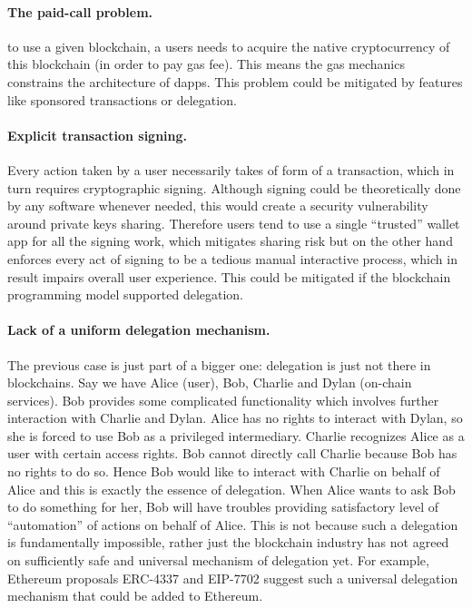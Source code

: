 \documentclass[a4paper]{article}
\begin{document}
\paragraph{The paid-call problem.} to use a given blockchain, a users needs to acquire the native cryptocurrency of this blockchain (in order to pay gas fee). This means the gas mechanics constrains the architecture of dapps. This problem could be mitigated by features like sponsored transactions or delegation.
\paragraph{Explicit transaction signing.} Every action taken by a user necessarily takes of form of a transaction, which in turn requires cryptographic signing. Although signing could be theoretically done by any software whenever needed, this would create a security vulnerability around private keys sharing. Therefore users tend to use a single ``trusted'' wallet app for all the signing work, which mitigates sharing risk but on the other hand enforces every act of signing to be a tedious manual interactive process, which in result impairs overall user experience. This could be mitigated if the blockchain programming model supported delegation.
\paragraph{Lack of a uniform delegation mechanism.} The previous case is just part of a bigger one: delegation is just not there in blockchains. Say we have Alice (user), Bob, Charlie and Dylan (on-chain services). Bob provides some complicated functionality which involves further interaction with Charlie and Dylan. Alice has no rights to interact with Dylan, so she is forced to use Bob as a privileged intermediary. Charlie recognizes Alice as a user with certain access rights. Bob cannot directly call Charlie because Bob has no rights to do so. Hence Bob would like to interact with Charlie on behalf of Alice and this is exactly the essence of delegation. When Alice wants to ask Bob to do something for her, Bob will have troubles providing satisfactory level of ``automation'' of actions on behalf of Alice. This is not because such a delegation is fundamentally impossible, rather just the blockchain industry has not agreed on sufficiently safe and universal mechanism of delegation yet. For example, Ethereum proposals ERC-4337 and EIP-7702 suggest such a universal delegation mechanism that could be added to Ethereum.
\end{document}
